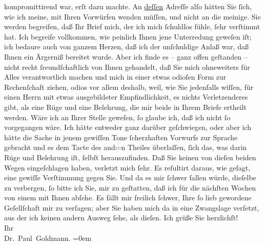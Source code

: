 \begin{ledgroupsized}[t]{13cm}
               kompromittirend war, erſt dazu machte. An \uline{deſſen}
               Adreſſe alſo hätten Sie ſich, wie ich meine, mit Ihren Vorwürfen wenden müſſen, und
               nicht an die meinige.\pend
           \pstart
           Sie werden begreifen, daß Ihr Brief mich, der ich mich ſchuldlos fühle, ſehr
               verſtimmt hat. Ich begreife vollkommen, wie peinlich Ihnen jene Unterredung geweſen
               iſt; ich bedaure auch von ganzem Herzen, daß ich der unſchuldige Anlaß war, daß Ihnen
               ein Ärgerniß bereitet wurde. Aber ich finde es – ganz offen geſtanden – {\pb}nicht recht ſreundſchaftlich von Ihnen gehandelt,
               daß Sie mich ohneweiters für Alles verantwortlich machen und mich in einer etwas
               odioſen Form zur Rechenſchaft ziehen, odios vor allem deshalb, weil, wie Sie
               jedenfalls wiſſen, \strikeout{\textcolor{gray}{e}}für einen Herrn mit etwas ausgebildeter Empfindlichkeit, es nichts
               Verletzenderes gibt, als eine Rüge und eine Belehrung, die mir beide in Ihrem Briefe
               ertheilt werden. Wäre ich an Ihrer Stelle geweſen, ſo glaube ich, daß ich nicht ſo
               vorgegangen wäre. Ich hätte entweder ganz darüber geſchwiegen, oder aber ich hätte
               die Sache in jenem gewiſſen Tone ſcherzhaften Vorwurfs zur Sprache gebracht und es
               dem Tacte des and\textcolor{gray}{re}n Theiles überlaſſen, ſich das, was darin Rüge
               und Belehrung iſt, ſelbſt herauszufinden.\pend
           \pstart
           Daß Sie  keinen von dieſen beiden Wegen
               eingeſchlagen haben, verletzt mich ſehr. Es reſultirt daraus, wie geſagt, eine
               gewiſſe Verſtimmung gegen Sie. Und da es mir ſchwer fallen würde, dieſelbe zu
               verbergen, ſo bitte ich Sie, \strikeout{\textcolor{gray}{d}} mir zu geſtatten, daß ich für die nächſten Wochen von einem {\pb}\label{K_L02646-1v}\label{K_L02646-1h}
               mit Ihnen abſehe. Es fällt mir freilich ſchwer, Ihre ſo lieb gewordene Geſellſchaft
               mir zu verſagen; aber Sie haben mich da in eine Zwangslage verſetzt, aus der ich
               keinen andern Ausweg ſehe, als dieſen.\pend
           \pstart
           Ich grüße Sie herzlichſt! {\\[\baselineskip]}Ihr {\\[\baselineskip]}\spacefill\mbox{Dr. Paul Goldmann.}\pend
           \leftskip=0em{}
         
         \endnumbering{}\end{ledgroupsized}  \newcommand{\dateiname}{L02646}\newcommand{\titel}{Paul Goldmann an Arthur Schnitzler, 6. 12. 1889}\newcommand{\editorInnen}{Martin Anton Müller und Laura Untner}
      